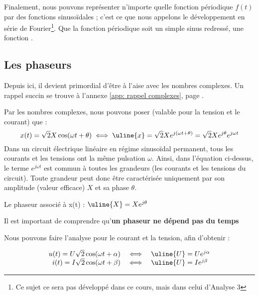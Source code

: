\documentclass[12pt,a4paper]{article}
\newcommand{\ux}{\uline{X} }
\newcommand{\uu}{\uline{U} }
\begin{document}
 Finalement, nous pouvons représenter n'importe quelle fonction périodique $f(t)$ par des fonctions sinusoïdales ; c'est ce que nous appelons le développement en série de Fourier\footnote{Ce sujet ce sera pas développé dans ce cours, mais dans celui d'Analyse 3}. Que la fonction périodique soit un simple sinus redressé, une fonction .

\subsection{Les phaseurs}
 Depuis ici, il devient primordial d'être à l'aise avec les nombres complexes. Un rappel succin se trouve à l'annexe \ref{app: rappel complexes}, page \pageref{app: rappel complexes}. 

 Par les nombres complexes, nous pouvons poser (valable pour la tension et le courant) que :
\begin{equation}
	x(t) = \sqrt{2}X \cos(\omega t + \theta) \iff \uline{x} = \sqrt{2}Xe^{j(\omega t + \theta)} = \sqrt{2}Xe^{j\theta}e^{j\omega t}
\end{equation}
Dans un circuit électrique linéaire en régime sinusoïdal permanent, tous les courants et les tensions ont la même pulsation $\omega$. Ainsi, dans l'équation ci-dessus, le terme $e^{j\omega t}$ est commun à toutes les grandeurs (les courants et les tensions du circuit). Toute grandeur peut donc être caractérisée uniquement par son amplitude (valeur efficace) $X$ et sa phase $\theta$. 
\begin{boite}[0.48]
\centering
	Le phaseur associé à x(t) : $\ux = Xe^{j\theta}$
\end{boite}
Il est important de comprendre qu'\textbf{un phaseur ne dépend pas du temps}

Nous pouvons faire l'analyse pour le courant et la tension, afin d'obtenir :
\begin{boite}
\begin{equation}
	\begin{array}{rcl}
	u(t) = U\sqrt{2}\cos(\omega t + \alpha) & \iff & \uu = Ue^{j\alpha}\\
	i(t) = I\sqrt{2}\cos(\omega t + \beta) & \iff & \uu = Ie^{j\beta}
	\end{array}
	\label{equ: relation courant tension phaseur}
\end{equation}
\end{boite}
\end{document}

